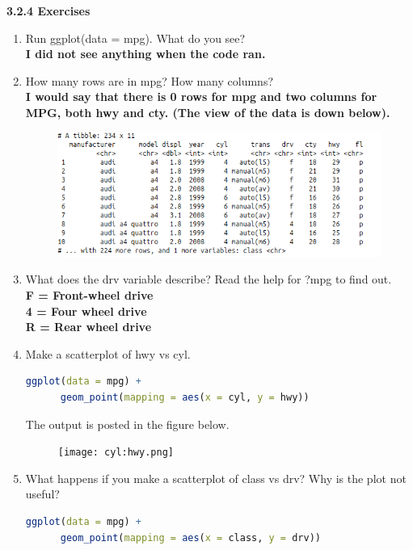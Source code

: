 \documentclass[11pt]{article}
\begin{document}
\newpage
\noindent\textbf{3.2.4 Exercises}


\begin{enumerate}
    


\item Run ggplot(data = mpg). What do you see?\\
\textbf{I did not see anything when the code ran.} 
\item How many rows are in mpg? How many columns?\\
\textbf{I would say that there is 0 rows for mpg and two columns for MPG, both hwy and cty. (The view of the data is down below).}
\begin{figure}[t]
\includegraphics[scale = .5]{chart.png}
\centering
\end{figure}

    
\item What does the drv variable describe? Read the help for ?mpg to find out.\\
\textbf{F = Front-wheel drive \\
4 = Four wheel drive  \\ 
R = Rear wheel drive 
}


\item Make a scatterplot of hwy vs cyl.
\begin{lstlisting}[language=R]
 ggplot(data = mpg) + 
      geom_point(mapping = aes(x = cyl, y = hwy))

\end{lstlisting}
The output is posted in the figure below. 
\begin{figure}[h]
\texttt{[image: cyl:hwy.png]}
\centering
\end{figure}


\item What happens if you make a scatterplot of class vs drv? Why is the plot not useful?
\begin{lstlisting}[language=R]
 ggplot(data = mpg) + 
      geom_point(mapping = aes(x = class, y = drv))
\end{lstlisting}




\end{enumerate}
\end{document}
